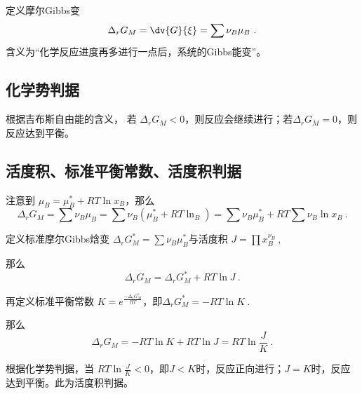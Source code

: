 定义摩尔Gibbs变
\begin{equation}
\Delta _r G_M = \dv{G}{\xi}=\sum \nu_B \mu_B~.
\end{equation}
含义为“化学反应进度再多进行一点后，系统的Gibbs能变”。

\subsection{化学势判据}
根据吉布斯自由能的含义，
若 $\Delta _r G_M<0$，则反应会继续进行；若$\Delta _r G_M = 0$，则反应达到平衡。

\subsection{活度积、标准平衡常数、活度积判据}
注意到 
$\mu_B=\mu_B^*+RT \ln x_B$，那么
\begin{equation} \label{eq_chemBl_1}
\Delta _r G_M =\sum \nu_B \mu_B = \sum \nu_B (\mu_B^*+RT\ln _B)=\sum \nu_B \mu_B^* + RT \sum \nu_B \ln x_B~.
\end{equation}

定义标准摩尔Gibbs焓变 $\Delta _r G_M^*=\sum \nu_B \mu_B^*$与活度积 $J=\prod x_B^{\nu_B}~,$

那么
\begin{equation}
\Delta _r G_M = \Delta _r G_M^* + RT \ln J~.
\end{equation}

再定义标准平衡常数 $K = e^{\frac{-\Delta _r G_M^*}{RT}}$，即$\Delta _r G_M^* = -RT \ln K~.$

那么 
\begin{equation}
\Delta _r G_M = -RT \ln K + RT \ln J = RT \ln \frac{J}{K}~.
\end{equation}

根据化学势判据，当 
$RT \ln \frac{J}{K} < 0$，即$J<K$时，反应正向进行；$J=K$时，反应达到平衡。此为活度积判据。
